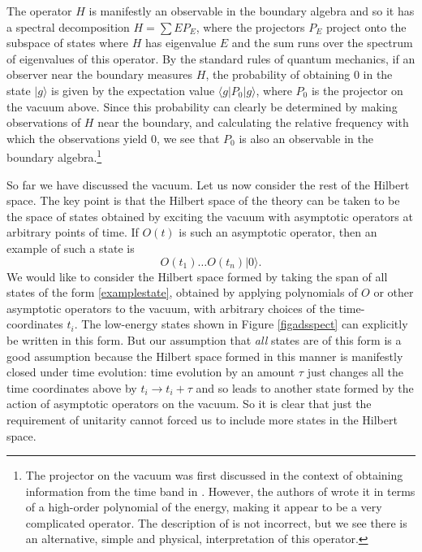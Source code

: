 \documentclass[12pt]{article}
\newcommand{\be}{\begin{equation}}
\newcommand{\ee}{\end{equation}}
\def\projvac{{\cal P}_{\Omega}}
\def\projvac{P_0}
\begin{document}
The operator $H$ is manifestly an observable in the boundary algebra and so it has a spectral decomposition $H = \sum E P_{E}$, where the projectors $P_{E}$ project onto the subspace of states where $H$ has eigenvalue $E$ and the sum runs over the spectrum of eigenvalues of this operator. By the standard rules of quantum mechanics, if an observer near the boundary measures $H$, the probability of obtaining $0$ in the state $|g \rangle$ is given by the expectation value $\langle g | \projvac | g \rangle$, where $\projvac$ is the projector on the vacuum above. Since this probability can clearly be determined by making observations of $H$ near the boundary, and calculating the relative frequency with which the observations yield $0$, we see that $\projvac$ is also an observable in the boundary algebra.\footnote{The projector on the vacuum was first discussed in the context of obtaining information from the time band in \cite{Banerjee:2016mhh}. However, the authors of \cite{Banerjee:2016mhh} wrote it in terms of a high-order polynomial of  the energy, making it appear to be a very complicated operator. The description of \cite{Banerjee:2016mhh} is not incorrect, but we see there is an alternative, simple and physical, interpretation of this operator.}

So far we have discussed the vacuum. Let us now consider the rest of the Hilbert space. The key point is that the Hilbert space of the theory can be taken to be the space of states obtained by exciting the vacuum with asymptotic operators
at arbitrary points of time. If $O(t)$ is such an asymptotic operator, then an example of such a state is
\be
\label{examplestate}
O(t_1) \ldots O(t_n) | 0 \rangle.
\ee
We would like to consider the Hilbert space formed by taking the span of all states of the form \eqref{examplestate}, obtained by applying polynomials of $O$ or other asymptotic operators to the vacuum, with arbitrary choices of the time-coordinates $t_i$. The low-energy states shown in Figure \ref{figadsspect} can explicitly be written in this form. But our assumption that {\em all} states are of this form is a good assumption because the Hilbert space formed in this manner is manifestly closed under time evolution: time evolution by an amount $\tau$ just changes all the time coordinates above by $t_i \rightarrow t_i + \tau$ and so leads to another state formed by the action of asymptotic operators on the vacuum. So it is clear that just the requirement of unitarity cannot forced us to include more states in the Hilbert space.
\end{document}
